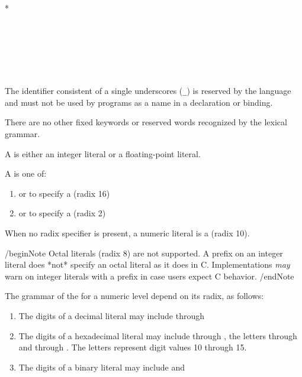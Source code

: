 \begin{Lexical}
     \\
         \\
        \SynOr {}*

     \\
         \\
        \SynOr {} \\
        \SynOr \SynRef{\lstinline{_}}

     \\
        \SynOr {}        
\end{Lexical}

The identifier consistent of a single underscores (\lstinline{_}) is reserved by the language and must not be used by programs as a name in a declaration or binding.

\begin{Note}
There are no other fixed keywords or reserved words recognized by the lexical grammar.
\end{Note}



A  is either an integer literal or a floating-point literal.

A  is one of:

\begin{enumerate}
    \item{ or  to specify a  (radix 16)}
    \item{ or  to specify a  (radix 2)}
\end{enumerate}
When no radix specifier is present, a numeric literal is a  (radix 10).

/begin{Note}
Octal literals (radix 8) are not supported.
A  prefix on an integer literal does *not* specify an octal literal as it does in C.
Implementations \emph{may} warn on integer literals with a  prefix in case users expect C behavior.
/end{Note}

The grammar of the  for a numeric level depend on its radix, as follows:

\begin{enumerate}
    \item{The digits of a decimal literal may include  through }
    \item{The digits of a hexadecimal literal may include  through , the letters  through  and  through . The letters represent digit values 10 through 15.}
    \item{The digits of a binary literal may include  and }
\end{enumerate}


